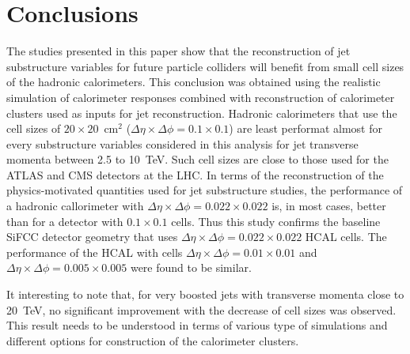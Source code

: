 \section{Conclusions}
The studies presented in this paper show that the reconstruction of jet substructure 
variables for future particle colliders will benefit from small cell sizes of the hadronic calorimeters. 
This conclusion was obtained using the realistic \GEANTfour simulation of calorimeter responses combined with reconstruction of 
calorimeter clusters used as inputs for jet reconstruction. 
Hadronic calorimeters that use the cell sizes of $20\times 20$~cm$^2$ ($\Delta \eta \times \Delta \phi = 0.1\times0.1$) 
are least performat almost for every 
substructure variables considered in this analysis for jet transverse momenta between 2.5 to 10~TeV. 
Such cell sizes are close to 
those used for the ATLAS and CMS detectors at the LHC. 
In terms of the reconstruction of the physics-motivated quantities  
used for jet substructure studies, the  performance 
of a  hadronic callorimeter  with 
$\Delta \eta \times \Delta \phi = 0.022\times0.022$ is, in most cases,
better than for a detector with  $0.1\times0.1$ cells.
Thus this study confirms the  baseline SiFCC detector geometry \cite{Chekanov:2016ppq}
that uses $\Delta \eta \times \Delta \phi = 0.022\times0.022$ HCAL cells.
The performance of the HCAL with cells $\Delta \eta \times \Delta \phi = 0.01\times0.01$ and 
$\Delta \eta \times \Delta \phi = 0.005\times0.005$ were found to be similar.

It interesting to note that,  for very boosted jets with transverse momenta close to 20~TeV, no significant improvement with the 
decrease of cell sizes was observed. This result needs to be understood in terms of various type of simulations and 
different options for construction of the calorimeter clusters.


